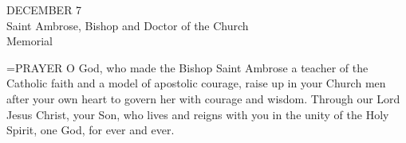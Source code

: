 \begin{center}\normalsize DECEMBER 7\\
\footnotesize Saint Ambrose, Bishop and Doctor of the Church\\
\footnotesize Memorial\\
\end{center}

\hangindent=\parindent \small{PRAYER 
O God, who made the Bishop Saint Ambrose
a teacher of the Catholic faith
and a model of apostolic courage,
raise up in your Church men after your own heart
to govern her with courage and wisdom.
Through our Lord Jesus Christ, your Son,
who lives and reigns with you in the unity of the Holy Spirit,
one God, for ever and ever.\\}
 
